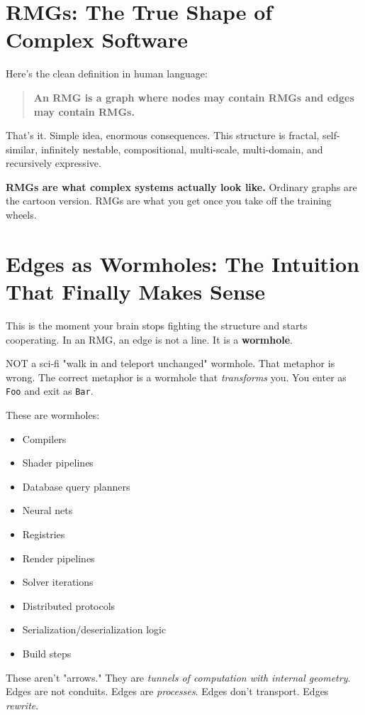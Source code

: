 \section{RMGs: The True Shape of Complex Software}
\label{sec:rmg-definition}

Here's the clean definition in human language:

\begin{quote}
\textbf{An RMG is a graph where nodes may contain RMGs and edges may contain RMGs.}
\end{quote}

That's it. Simple idea, enormous consequences. This structure is fractal, self-similar, infinitely nestable, compositional, multi-scale, multi-domain, and recursively expressive.

\textbf{RMGs are what complex systems actually look like.} Ordinary graphs are the cartoon version. RMGs are what you get once you take off the training wheels.

\section{Edges as Wormholes: The Intuition That Finally Makes Sense}
\label{sec:edges-wormholes}

This is the moment your brain stops fighting the structure and starts cooperating. In an RMG, an edge is not a line. It is a \textbf{wormhole}.

NOT a sci-fi "walk in and teleport unchanged" wormhole. That metaphor is wrong. The correct metaphor is a wormhole that \textit{transforms} you. You enter as \texttt{Foo} and exit as \texttt{Bar}.

These are wormholes:
\begin{itemize}
    \item Compilers
    \item Shader pipelines
    \item Database query planners
    \item Neural nets
    \item Registries
    \item Render pipelines
    \item Solver iterations
    \item Distributed protocols
    \item Serialization/deserialization logic
    \item Build steps
\end{itemize}

These aren't "arrows." They are \textit{tunnels of computation with internal geometry}. Edges are not conduits. Edges are \textit{processes}. Edges don't transport. Edges \textit{rewrite}.


